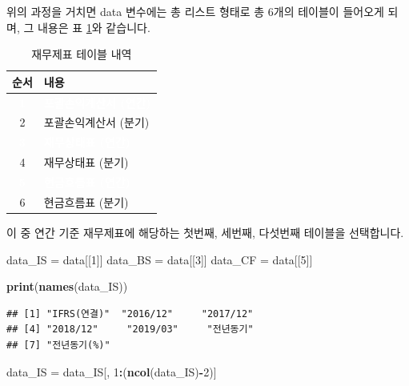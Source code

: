\documentclass[12pt,]{book}
\newenvironment{Shaded}{\begin{snugshade}}{\end{snugshade}}
\newcommand{\DecValTok}[1]{\textcolor[rgb]{0.00,0.00,0.81}{#1}}
\newcommand{\KeywordTok}[1]{\textcolor[rgb]{0.13,0.29,0.53}{\textbf{#1}}}
\newcommand{\NormalTok}[1]{#1}
\newcommand{\OperatorTok}[1]{\textcolor[rgb]{0.81,0.36,0.00}{\textbf{#1}}}
\newcommand{\StringTok}[1]{\textcolor[rgb]{0.31,0.60,0.02}{#1}}
\begin{document}
위의 과정을 거치면 data 변수에는 총 리스트 형태로 총 6개의 테이블이 들어오게 되며, 그 내용은 표 \ref{tab:fstable}와 같습니다.

\begin{table}[!h]

\caption{\label{tab:fstable}재무제표 테이블 내역}
\centering
\begin{tabular}{c>{\centering\arraybackslash}p{5cm}}
\toprule
순서 & 내용\\
\midrule
\rowcolor{gray!6}  \rowcolor{black}  \textcolor{white}{\textbf{1}} & \textcolor{white}{\textbf{포괄손익계산서 (연간)}}\\
2 & 포괄손익계산서 (분기)\\
\rowcolor{gray!6}  \rowcolor{black}  \textcolor{white}{\textbf{3}} & \textcolor{white}{\textbf{재무상태표 (연간)}}\\
4 & 재무상태표 (분기)\\
\rowcolor{gray!6}  \rowcolor{black}  \textcolor{white}{\textbf{5}} & \textcolor{white}{\textbf{현금흐름표 (연간)}}\\
6 & 현금흐름표 (분기)\\
\bottomrule
\end{tabular}
\end{table}

이 중 연간 기준 재무제표에 해당하는 첫번째, 세번째, 다섯번째 테이블을 선택합니다.

\begin{Shaded}
\begin{Highlighting}[]
\NormalTok{data_IS =}\StringTok{ }\NormalTok{data[[}\DecValTok{1}\NormalTok{]]}
\NormalTok{data_BS =}\StringTok{ }\NormalTok{data[[}\DecValTok{3}\NormalTok{]]}
\NormalTok{data_CF =}\StringTok{ }\NormalTok{data[[}\DecValTok{5}\NormalTok{]]}

\KeywordTok{print}\NormalTok{(}\KeywordTok{names}\NormalTok{(data_IS))}
\end{Highlighting}
\end{Shaded}

\begin{verbatim}
## [1] "IFRS(연결)"  "2016/12"     "2017/12"    
## [4] "2018/12"     "2019/03"     "전년동기"   
## [7] "전년동기(%)"
\end{verbatim}

\begin{Shaded}
\begin{Highlighting}[]
\NormalTok{data_IS =}\StringTok{ }\NormalTok{data_IS[, }\DecValTok{1}\OperatorTok{:}\NormalTok{(}\KeywordTok{ncol}\NormalTok{(data_IS)}\OperatorTok{-}\DecValTok{2}\NormalTok{)]}
\end{Highlighting}
\end{Shaded}
\end{document}
